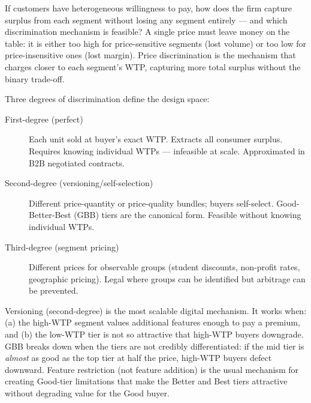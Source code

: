 If customers have heterogeneous willingness to pay, how does the firm capture surplus from each segment without losing any segment entirely --- and which discrimination mechanism is feasible? A single price must leave money on the table: it is either too high for price-sensitive segments (lost volume) or too low for price-insensitive ones (lost margin). Price discrimination is the mechanism that charges closer to each segment's WTP, capturing more total surplus without the binary trade-off.

Three degrees of discrimination define the design space:

\begin{description}
  \item[First-degree (perfect)] Each unit sold at buyer's exact WTP. Extracts all consumer surplus. Requires knowing individual WTPs --- infeasible at scale. Approximated in B2B negotiated contracts.
  \item[Second-degree (versioning/self-selection)] Different price-quantity or price-quality bundles; buyers self-select. Good-Better-Best (GBB) tiers are the canonical form. Feasible without knowing individual WTPs.
  \item[Third-degree (segment pricing)] Different prices for observable groups (student discounts, non-profit rates, geographic pricing). Legal where groups can be identified but arbitrage can be prevented.
\end{description}

Versioning (second-degree) is the most scalable digital mechanism. It works when: (a) the high-WTP segment values additional features enough to pay a premium, and (b) the low-WTP tier is not so attractive that high-WTP buyers downgrade. GBB breaks down when the tiers are not credibly differentiated: if the mid tier is \emph{almost} as good as the top tier at half the price, high-WTP buyers defect downward. Feature restriction (not feature addition) is the usual mechanism for creating Good-tier limitations that make the Better and Best tiers attractive without degrading value for the Good buyer.


